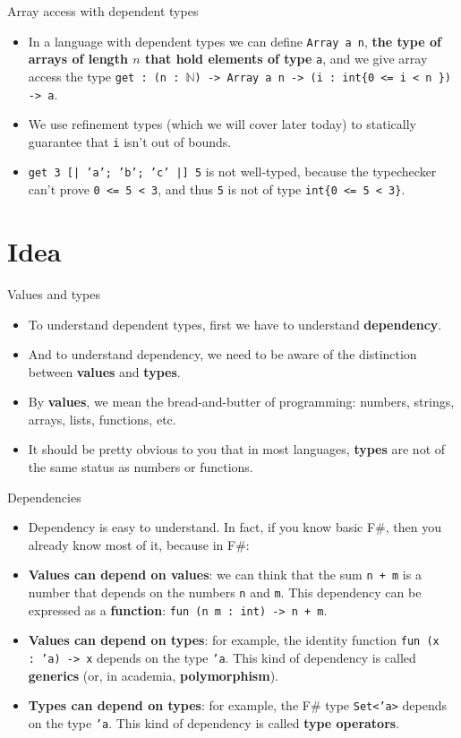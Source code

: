 \documentclass{beamer}
\newcommand{\m}[1]{\texttt{#1}}
\begin{document}
\begin{frame}{Array access with dependent types}
\begin{itemize}
	\item In a language with dependent types we can define \m{Array a n}, \textbf{the type of arrays of length $n$ that hold elements of type} \m{a}, and we give array access the type \m{get :\ (n :\ $\mathbb{N}$) -> Array a n -> (i :\ int\{0 <= i < n \}) -> a}.
	\item We use refinement types (which we will cover later today) to statically guarantee that \m{i} isn't out of bounds.
	\item \m{get 3 [| 'a'; 'b'; 'c' |] 5} is not well-typed, because the typechecker can't prove \m{0 <= 5 < 3}, and thus \m{5} is not of type \m{int\{0 <= 5 < 3\}}.
\end{itemize}
\end{frame}

\section{Idea}

\begin{frame}{Values and types}
\begin{itemize}
	\item To understand dependent types, first we have to understand \textbf{dependency}.
	\item And to understand dependency, we need to be aware of the distinction between \textbf{values} and \textbf{types}.
	\item By \textbf{values}, we mean the bread-and-butter of programming: numbers, strings, arrays, lists, functions, etc.
	\item It should be pretty obvious to you that in most languages, \textbf{types} are not of the same status as numbers or functions.
\end{itemize}
\end{frame}

\begin{frame}{Dependencies}
\begin{itemize}
	\item Dependency is easy to understand. In fact, if you know basic F\#, then you already know most of it, because in F\#:
	\item \textbf{Values can depend on values}: we can think that the sum \m{n + m} is a number that depends on the numbers \m{n} and \m{m}. This dependency can be expressed as a \textbf{function}: \m{fun (n m :\ int) -> n + m}.
	\item \textbf{Values can depend on types}: for example, the identity function \m{fun (x :\ 'a) -> x} depends on the type \m{'a}. This kind of dependency is called \textbf{generics} (or, in academia, \textbf{polymorphism}).
	\item \textbf{Types can depend on types}: for example, the F\# type \m{Set<'a>} depends on the type \m{'a}. This kind of dependency is called \textbf{type operators}.
\end{itemize}
\end{frame}
\end{document}
